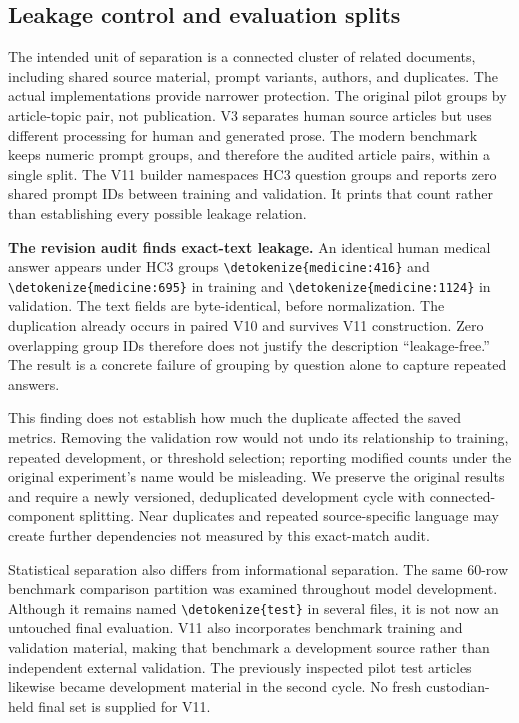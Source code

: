 \documentclass[11pt]{article}
\newcommand{\code}[1]{\expandafter\nolinkurl\expandafter{\detokenize{#1}}}
\begin{document}
\subsection{Leakage control and evaluation splits}
The intended unit of separation is a connected cluster of related documents,
including shared source material, prompt variants, authors, and duplicates.
The actual implementations provide narrower protection. The original pilot
groups by article-topic pair, not publication. V3 separates human source
articles but uses different processing for human and generated prose.
The modern benchmark keeps numeric prompt groups, and therefore the audited
article pairs, within a single split. The V11 builder namespaces HC3 question
groups and reports zero shared prompt IDs between training and validation.
It prints that count rather than establishing every possible leakage relation.

\textbf{The revision audit finds exact-text leakage.} An identical human
medical answer appears under HC3 groups \code{medicine:416} and
\code{medicine:695} in training and \code{medicine:1124} in validation.
The text fields are byte-identical, before normalization. The duplication
already occurs in paired V10 and survives V11 construction. Zero overlapping
group IDs therefore does not justify the description ``leakage-free.''
The result is a concrete failure of grouping by question alone to capture
repeated answers.

This finding does not establish how much the duplicate affected the saved
metrics. Removing the validation row would not undo its relationship to
training, repeated development, or threshold selection; reporting modified
counts under the original experiment's name would be misleading. We preserve
the original results and require a newly versioned, deduplicated development
cycle with connected-component splitting. Near duplicates and repeated
source-specific language may create further dependencies not measured by
this exact-match audit.

Statistical separation also differs from informational separation. The same
60-row benchmark comparison partition was examined throughout model
development. Although it remains named \code{test} in several files, it is
not now an untouched final evaluation. V11 also incorporates benchmark
training and validation material, making that benchmark a development source
rather than independent external validation. The previously inspected pilot
test articles likewise became development material in the second cycle.
No fresh custodian-held final set is supplied for V11.
\end{document}
